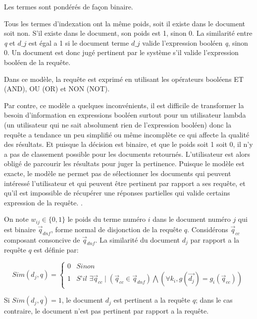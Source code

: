 Les termes sont pondérés de façon binaire.

Tous les termes d'indexation ont la même poids, soit il existe dans le document soit non. S'il existe dans le document, son poids est 1, sinon 0. La similarité entre \textit{q} et $\textit{d\_{j}}$ est égal a 1 si le document terme $\textit{d\_{j}}$ valide l'expression booléen \textit{q}, sinon 0. Un document est donc jugé pertinent par le système s'il valide l'expression booléen de la requête.

Dans ce modèle, la requête est exprimé en utilisant les opérateurs booléens ET (AND), OU (OR) et NON (NOT).

Par contre, ce modèle a quelques inconvénients, il est difficile de transformer la besoin d'information en expressions booléen surtout pour un utilisateur lambda (un utilisateur qui ne sait absolument rien de l'expression booléen) donc la requête a tendance un peu simplifié ou même incomplète ce qui affecte la qualité des résultats. Et puisque la décision est binaire, et que le poids soit 1 soit 0, il n'y a pas de classement possible pour les documents retournés. L'utilisateur est alors obligé de parcourir les résultats pour juger la pertinence. Puisque le modèle est exacte, le modèle ne permet pas de sélectionner les documents qui peuvent intéressé l'utilisateur et qui peuvent être pertinent par rapport a ses requête, et qu'il est impossible de récupérer une réponses partielles qui valide certains expression de la requête. \citep*{modern-ir, soulier2014:def-evaluation-modele}.

\begin{definition}
    On note $w_{ij} \in \{0, 1\}$ le poids du terme numéro $i$ dans le document numéro $j$ qui est binaire $ \vec{q}_{dnf} $, forme normal de disjonction de la requête $ q $. Considérons $ \vec{q}_{cc} $ composant consoncive de $ \vec{q}_{dnf} $. La similarité du document $ d_{j} $ par rapport a la requête $ q $ est définie par:

    \[
        Sim(d_{j}, q) = \left\{
        \begin{array}{ll}
            0 & Sinon \\
            1 & \textit{S'il } \exists \vec{q}_{cc} \mid (\vec{q}_{cc} \in \vec{q}_{dnf}) \bigwedge (\forall k_{i}, g(\vec{d_{j}}) = g_{i}(\vec{q}_{cc}))
        \end{array}
        \right.
    \]

    Si $ Sim(d_{j}, q) = 1$, le document $ d_{j} $ est pertinent a la requête $ q $; dans le cas contraire, le document n'est pas pertinent par rapport a la requête.
\end{definition}

